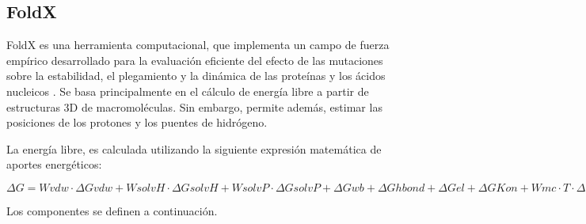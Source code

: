 \subsection{FoldX}

FoldX es una herramienta computacional, que implementa un campo de fuerza empírico desarrollado para la evaluación eficiente del efecto de las mutaciones sobre la estabilidad, el plegamiento y la dinámica de las proteínas y los ácidos nucleicos \cite{Schymkowitz2005}. Se basa principalmente en el cálculo de energía libre a partir de estructuras 3D de macromoléculas. Sin embargo, permite además, estimar las posiciones de los protones y los puentes de hidrógeno. 

La energía libre, es calculada utilizando la siguiente expresión matemática de aportes energéticos:


$\Delta G=Wvdw \cdot \Delta Gvdw+WsolvH \cdot \Delta GsolvH+WsolvP \cdot \Delta GsolvP+ \Delta Gwb+ \Delta Ghbond+ \Delta Gel+ \Delta GKon+Wmc \cdot T \cdot \Delta Smc+Wsc \cdot T \cdot \Delta Ssc$

Los componentes se definen a continuación.

